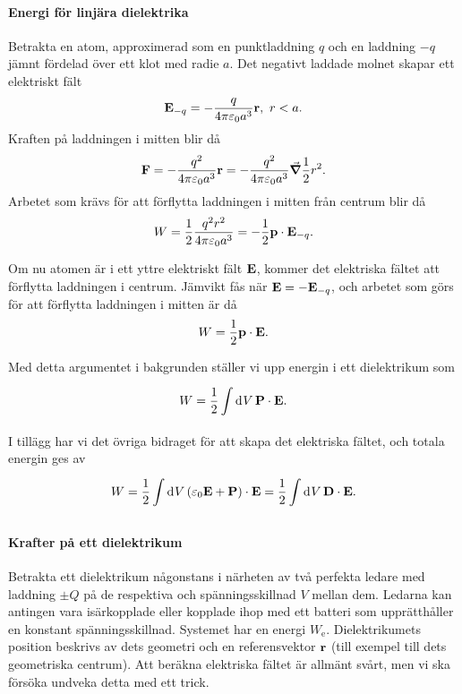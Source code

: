 \paragraph{Energi för linjära dielektrika}
Betrakta en atom, approximerad som en punktladdning $q$ och en laddning $-q$ jämnt fördelad över ett klot med radie $a$. Det negativt laddade molnet skapar ett elektriskt fält
\begin{align*}
	\vb{E}_{-q} = -\frac{q}{4\pi\varepsilon_{0}a^{3}}\vb{r},\ r < a.
\end{align*}
Kraften på laddningen i mitten blir då
\begin{align*}
	\vb{F} = -\frac{q^{2}}{4\pi\varepsilon_{0}a^{3}}\vb{r} = -\frac{q^{2}}{4\pi\varepsilon_{0}a^{3}}\grad{\frac{1}{2}r^{2}}.
\end{align*}
Arbetet som krävs för att förflytta laddningen i mitten från centrum blir då
\begin{align*}
	W = \frac{1}{2}\frac{q^{2}r^{2}}{4\pi\varepsilon_{0}a^{3}} = -\frac{1}{2}\vb{p}\cdot\vb{E}_{-q}.
\end{align*}

Om nu atomen är i ett yttre elektriskt fält $\vb{E}$, kommer det elektriska fältet att förflytta laddningen i centrum. Jämvikt fås när $\vb{E} = -\vb{E}_{-q}$, och arbetet som görs för att förflytta laddningen i mitten är då
\begin{align*}
	W = \frac{1}{2}\vb{p}\cdot\vb{E}.
\end{align*}

Med detta argumentet i bakgrunden ställer vi upp energin i ett dielektrikum som
\begin{align*}
	W = \frac{1}{2}\int\limits_{}^{}\dd[]{V}\vb{P}\cdot\vb{E}.
\end{align*}
I tillägg har vi det övriga bidraget för att skapa det elektriska fältet, och totala energin ges av
\begin{align*}
	W = \frac{1}{2}\int\limits_{}^{}\dd[]{V}(\varepsilon_{0}\vb{E} + \vb{P})\cdot\vb{E} = \frac{1}{2}\int\limits_{}^{}\dd[]{V}\vb{D}\cdot\vb{E}.
\end{align*}

\paragraph{Krafter på ett dielektrikum}
Betrakta ett dielektrikum någonstans i närheten av två perfekta ledare med laddning $\pm Q$ på de respektiva och spänningsskillnad $V$ mellan dem. Ledarna kan antingen vara isärkopplade eller kopplade ihop med ett batteri som upprätthåller en konstant spänningsskillnad. Systemet har en energi $W_{\text{e}}$. Dielektrikumets position beskrivs av dets geometri och en referensvektor $\vb{r}$ (till exempel till dets geometriska centrum). Att beräkna elektriska fältet är allmänt svårt, men vi ska försöka undveka detta med ett trick.


